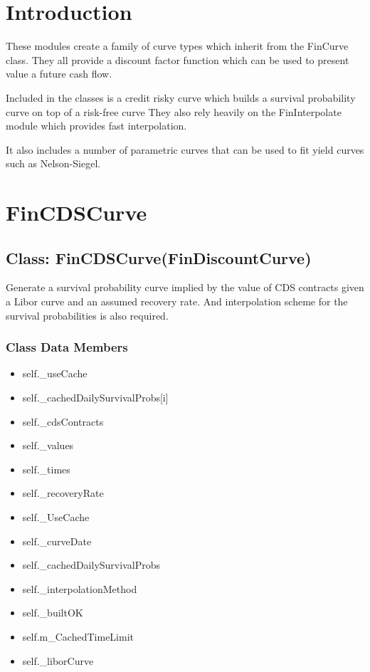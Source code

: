 \documentclass[twoside,11pt]{book}
\begin{document}
\section{Introduction}
These modules create a family of curve types which inherit from the FinCurve class. They all provide a discount factor function which can be used to present value a future cash flow. 

Included in the classes is a credit risky curve which builds a survival probability curve on top of a risk-free curve They also rely heavily on the FinInterpolate module which provides fast interpolation.

It also includes a number of parametric curves that can be used to fit yield curves such as Nelson-Siegel.
\newpage
\section{FinCDSCurve}

\subsection{Class: FinCDSCurve(FinDiscountCurve)}
Generate a survival probability curve implied by the value of CDS contracts given a Libor curve and an assumed recovery rate. And interpolation scheme for the survival probabilities is also required. 

\subsubsection{Class Data Members}
\begin{itemize}
\item{self.\_useCache}
\item{self.\_cachedDailySurvivalProbs[i]}
\item{self.\_cdsContracts}
\item{self.\_values}
\item{self.\_times}
\item{self.\_recoveryRate}
\item{self.\_UseCache}
\item{self.\_curveDate}
\item{self.\_cachedDailySurvivalProbs}
\item{self.\_interpolationMethod}
\item{self.\_builtOK}
\item{self.m\_CachedTimeLimit}
\item{self.\_liborCurve}
\end{itemize}
\end{document}
